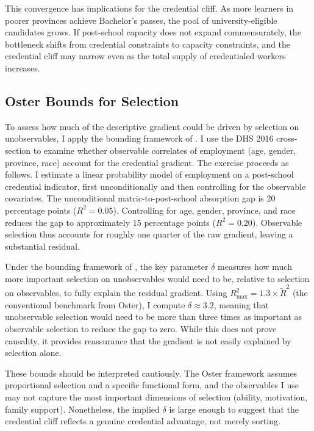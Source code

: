 \documentclass[12pt]{article}
\begin{document}
This convergence has implications for the credential cliff. As more learners in poorer provinces achieve Bachelor's passes, the pool of university-eligible candidates grows. If post-school capacity does not expand commensurately, the bottleneck shifts from credential constraints to capacity constraints, and the credential cliff may narrow even as the total supply of credentialed workers increases.

\subsection{Oster Bounds for Selection}

To assess how much of the descriptive gradient could be driven by selection on unobservables, I apply the bounding framework of \citet{oster2019unobservable}. I use the DHS 2016 cross-section to examine whether observable correlates of employment (age, gender, province, race) account for the credential gradient. The exercise proceeds as follows. I estimate a linear probability model of employment on a post-school credential indicator, first unconditionally and then controlling for the observable covariates. The unconditional matric-to-post-school absorption gap is 20 percentage points ($R^2 = 0.05$). Controlling for age, gender, province, and race reduces the gap to approximately 15 percentage points ($R^2 = 0.20$). Observable selection thus accounts for roughly one quarter of the raw gradient, leaving a substantial residual.

Under the bounding framework of \citet{oster2019unobservable}, the key parameter $\delta$ measures how much more important selection on unobservables would need to be, relative to selection on observables, to fully explain the residual gradient. Using $R^2_{\max} = 1.3 \times \tilde{R}^2$ (the conventional benchmark from Oster), I compute $\delta \approx 3.2$, meaning that unobservable selection would need to be more than three times as important as observable selection to reduce the gap to zero. While this does not prove causality, it provides reassurance that the gradient is not easily explained by selection alone.

These bounds should be interpreted cautiously. The Oster framework assumes proportional selection and a specific functional form, and the observables I use may not capture the most important dimensions of selection (ability, motivation, family support). Nonetheless, the implied $\delta$ is large enough to suggest that the credential cliff reflects a genuine credential advantage, not merely sorting.
\end{document}
